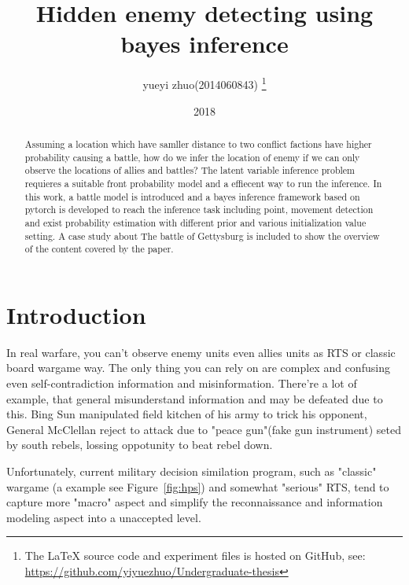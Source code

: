 \documentclass{article}
\title{Hidden enemy detecting using bayes inference}
\author{yueyi zhuo(2014060843) 
 \footnote{The LaTeX source code and experiment files is hosted on GitHub, see: 
 \url{https://github.com/yiyuezhuo/Undergraduate-thesis}}}
\date{2018}
\begin{document}
\maketitle

\begin{abstract}

Assuming a location which have samller distance to two conflict factions have higher probability causing a battle,
how do we infer the location of enemy if we can only observe the locations of allies and battles? 
The latent variable inference problem requieres a suitable front probability model and a effiecent way to run the 
inference. In this work, a battle model is introduced and a bayes inference framework based on pytorch 
is developed to reach the inference task including point, movement detection and 
exist probability estimation with different prior and various initialization value setting.
A case study about The battle of Gettysburg is included to show the overview of the content covered by the paper.

\end{abstract}

\tableofcontents



\section{Introduction}

In real warfare, you can't observe enemy units even allies units as RTS or classic board wargame way.
The only thing you can rely on are complex and confusing even self-contradiction information and misinformation.
There're a lot of example, that general misunderstand information and may be defeated due to this. 
Bing Sun manipulated field kitchen of his army to trick his opponent, General McClellan reject to attack
due to "peace gun"(fake gun instrument) seted by south rebels, lossing oppotunity to beat rebel down.

Unfortunately, current military decision similation program, 
such as "classic" wargame (a example see Figure~\ref{fig:hps}) and somewhat  "serious" RTS, 
tend to capture more "macro" aspect and simplify the reconnaissance and 
information modeling aspect into a unaccepted level.
\end{document}
